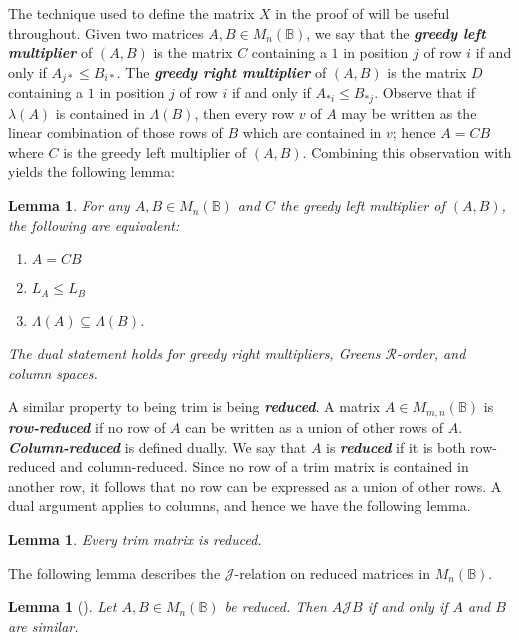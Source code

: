 \documentclass[11pt]{article}
\newtheorem{lemma}[thm]{Lemma}
\newcommand{\defn}[1]{\textbf{\textit{#1}}}
\numberwithin{equation}{section}
\newcommand{\B}{\mathbb{B}}
\newcommand{\Bn}{M_n(\B)}
\newcommand{\Bmn}{M_{m,n}(\B)}
\newcommand{\R}{\mathscr{R}}
\newcommand{\J}{\mathscr{J}}
\newcommand{\RowS}{\Lambda}
\newcommand{\RowB}{\lambda}
\begin{document}
The technique used to define the matrix $X$ in the proof of
 will be useful throughout. Given two matrices
$A, B \in \Bn$, we say that the \defn{greedy left multiplier} of $(A, B)$ is the
matrix $C$ containing a $1$ in position $j$ of row $i$ if and only if $A_{j*}
\leq B_{i*}$. The \defn{greedy right multiplier} of $(A, B)$ is the matrix $D$
containing a $1$ in position $j$ of row $i$ if and only if $A_{*i} \leq B_{*j}$.
Observe that if $\RowB(A)$ is contained in $\RowS(B)$, then every row $v$ of $A$
may be written as the linear combination of those rows of $B$ which are
contained in $v$; hence $A = CB$ where $C$ is the greedy left multiplier of $(A,
B)$. Combining this observation with  yields
the following lemma:
\begin{lemma}
  For any $A, B \in \Bn$ and $C$ the greedy left multiplier of $(A, B)$, the
  following are equivalent:
  \begin{enumerate}[label={\rm (\roman*)}]
    \item $A = CB$
    \item $L_A \leq L_B$
    \item $\RowS(A) \subseteq \RowS(B)$.
  \end{enumerate}
  The dual statement holds for greedy right multipliers, Greens $\R$-order, and
  column spaces.
\end{lemma}

A similar property to being trim is being \defn{reduced}. A matrix $A \in \Bmn$
is \defn{row-reduced} if no row of $A$ can be written as a union of other rows
of $A$. \defn{Column-reduced} is defined dually. We say that $A$ is
\defn{reduced} if it is both row-reduced and column-reduced. Since no row of a
trim matrix is contained in another row, it follows that no row can be expressed
as a union of other rows. A dual argument applies to columns, and hence we have
the following lemma.

\begin{lemma}
  Every trim matrix is reduced.
\end{lemma}

The following lemma describes the $\J$-relation on reduced matrices in $\Bn$.

\begin{lemma}[{\cite[Theorem 1.8]{Plemmons1970aa}}]
  Let $A, B \in \Bn$ be reduced. Then $A \J B$ if and only if $A$ and $B$ are
  similar.
\end{lemma}
\end{document}
